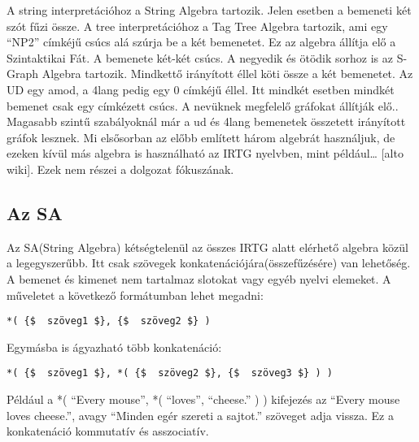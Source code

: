 A string interpretációhoz a String Algebra tartozik. Jelen esetben a bemeneti két szót fűzi össze. A tree interpretációhoz a Tag Tree Algebra tartozik, ami egy “NP2” címkéjű csúcs alá szúrja be a két bemenetet. Ez az algebra állítja elő a Szintaktikai Fát. A bemenete két-két csúcs.  A negyedik és ötödik sorhoz is az S-Graph Algebra tartozik. Mindkettő irányított éllel köti össze a két bemenetet. Az UD egy amod, a 4lang pedig egy 0 címkéjű éllel. Itt mindkét esetben mindkét bemenet csak egy címkézett csúcs. A nevüknek megfelelő gráfokat állítják elő.. Magasabb szintű szabályoknál már a ud és 4lang bemenetek összetett irányított gráfok lesznek. Mi elsősorban az előbb említett  három algebrát használjuk, de ezeken kívül más algebra is használható az IRTG nyelvben, mint például… [alto wiki]. Ezek nem részei a dolgozat fókuszának.



\subsection{Az SA}
Az SA(String Algebra) kétségtelenül az összes IRTG alatt elérhető algebra közül a legegyszerűbb. Itt csak szövegek konkatenációjára(összefűzésére) van lehetőség. A bemenet és kimenet nem tartalmaz slotokat vagy egyéb nyelvi elemeket. A műveletet a következő formátumban lehet megadni:
\begin{verbatim}
*( {$  szöveg1 $}, {$  szöveg2 $} )
\end{verbatim}

Egymásba is ágyazható több konkatenáció:
\begin{verbatim}
*( {$  szöveg1 $}, *( {$  szöveg2 $}, {$  szöveg3 $} ) )
\end{verbatim}

Például a *( “Every mouse”, *( “loves”, “cheese.” ) ) kifejezés az “Every mouse loves cheese.”, avagy  “Minden egér szereti a sajtot.” szöveget adja vissza. Ez a konkatenáció kommutatív és asszociatív.



